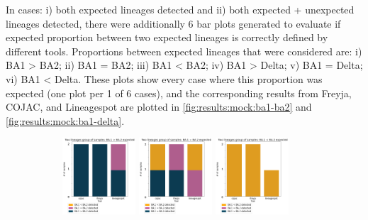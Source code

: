                 In cases: i) both expected lineages detected and ii) both expected + unexpected lineages detected, there were additionally 6 bar plots generated to evaluate if expected proportion between two expected lineages is correctly defined by different tools. Proportions between expected lineages that were considered are: i) BA1 > BA2; ii) BA1 = BA2; iii) BA1 < BA2; iv) BA1 > Delta;  v) BA1 = Delta; vi) BA1 < Delta. These plots show every case where this proportion was expected (one plot per 1 of 6 cases), and the corresponding results from Freyja, COJAC, and Lineagespot are plotted in \cref{fig:results:mock:ba1-ba2} and \cref{fig:results:mock:ba1-delta}.
                \begin{figure}[H]
                    \begin{subfigure}{\linewidth}
                	\centering
                    \includegraphics[width=0.3\textwidth]{figures/results/mock/ba1Gba2-bars.png}\hfill
                    \includegraphics[width=0.3\textwidth]{figures/results/mock/ba1EQba2-bars.png}\hfill
                    \includegraphics[width=0.3\textwidth]{figures/results/mock/ba1Lba2-bars.png}

\end{subfigure}
\end{figure}
